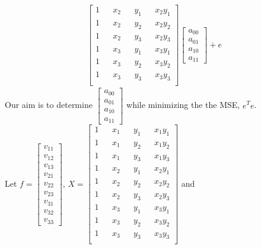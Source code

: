 \documentclass[a4paper,fleqn,11pt]{article}
\theoremstyle{mytheor}
\begin{document}
\begin{align}
\begin{bmatrix}
				1 && x_2 &&	y_1 && x_2y_1 \\
				1 && x_2 &&	y_2 && x_2y_2 \\
				1 && x_2 &&	y_3 && x_2y_3 \\
				1 && x_3 &&	y_1 && x_3y_1 \\
				1 && x_3 &&	y_2 && x_3y_2 \\
				1 && x_3 &&	y_3 && x_3y_3 \\
			\end{bmatrix}
			\begin{bmatrix}
				a_{00} \\
				a_{01} \\
				a_{10} \\
				a_{11}	
			\end{bmatrix} + e
\end{align}
Our aim is to determine $\begin{bmatrix}
							a_{00} \\
							a_{01} \\
							a_{10} \\
							a_{11}	
						  \end{bmatrix}$ while minimizing the the MSE, $e^Te$. \\
Let $f = \begin{bmatrix}
				v_{11} \\
				v_{12} \\
				v_{13} \\
				v_{21} \\
				v_{22} \\
				v_{23} \\
				v_{31} \\
				v_{32} \\
				v_{33}
			\end{bmatrix}$,
    $X = \begin{bmatrix}
				1 && x_1 &&	y_1 && x_1y_1 \\
				1 && x_1 &&	y_2 && x_1y_2 \\
				1 && x_1 &&	y_3 && x_1y_3 \\
				1 && x_2 &&	y_1 && x_2y_1 \\
				1 && x_2 &&	y_2 && x_2y_2 \\
				1 && x_2 &&	y_3 && x_2y_3 \\
				1 && x_3 &&	y_1 && x_3y_1 \\
				1 && x_3 &&	y_2 && x_3y_2 \\
				1 && x_3 &&	y_3 && x_3y_3 \\
			\end{bmatrix}$ and
\end{document}
